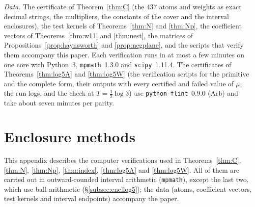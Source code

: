 \documentclass[11pt]{amsart}
\theoremstyle{definition}
\theoremstyle{remark}
\begin{document}
\emph{Data.} The certificate of Theorem~\ref{thm:C} (the $437$ atoms and weights as exact decimal
strings, the multipliers, the constants of the cover and the interval enclosures), the test kernels
of Theorems~\ref{thm:N} and \ref{thm:Np}, the coefficient vectors of Theorems~\ref{thm:w11} and
\ref{thm:nest}, the matrices of Propositions~\ref{prop:haynsworth} and \ref{prop:negplane}, and the
scripts that verify them accompany this paper. Each verification runs in at most a few minutes on one
core with Python~3, \texttt{mpmath}~1.3.0 and \texttt{scipy}~1.11.4. The certificates of
Theorems~\ref{thm:log5A} and \ref{thm:log5W} (the verification scripts for the primitive and the complete
form, their outputs with every certified and failed value of $\mu$, the run logs, and the check at
$T=\frac12\log3$) use \texttt{python-flint}~0.9.0 (Arb) and take about seven minutes per parity.



\appendix

\section{Enclosure methods}\label{app:encl}

This appendix describes the computer verifications used in Theorems~\ref{thm:C}, \ref{thm:N},
\ref{thm:Np}, \ref{thm:index}, \ref{thm:log5A} and \ref{thm:log5W}. All of them are carried out in
outward-rounded interval arithmetic (\texttt{mpmath}), except the last two, which use ball arithmetic
(\S\ref{subsec:encllog5}); the data (atoms, coefficient vectors, test kernels and interval endpoints)
accompany the paper.
\end{document}
